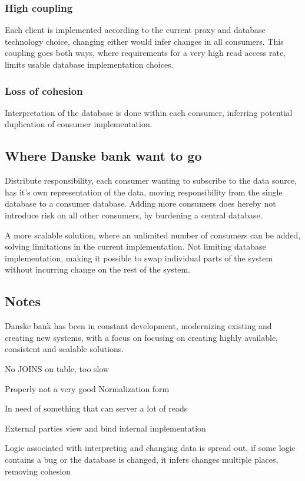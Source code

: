 \subsubsection{High coupling}
Each client is implemented according to the current proxy and database technology choice, changing either would infer changes in all consumers.
This coupling goes both ways, where requirements for a very high read access rate, limits usable database implementation choices.

\subsubsection{Loss of cohesion}
Interpretation of the database is done within each consumer, inferring potential duplication of consumer implementation.


\subsection{Where Danske bank want to go}
Distribute responsibility, each consumer wanting to subscribe to the data source, has it's own representation of the data, moving responsibility from the single database to a consumer database. Adding more consumers does hereby not introduce risk on all other consumers, by burdening a central database.


A more scalable solution, where an unlimited number of consumers can be added, solving limitations in the current implementation. Not limiting database implementation, making it possible to swap individual parts of the system without incurring change on the rest of the system.


\subsection*{Notes}


Danske bank has been in constant development, modernizing existing and creating new systems, with a focus on 
focusing on creating highly available, consistent and scalable solutions.


No JOINS on table, too slow


Properly not a very good Normalization form


In need of something that can server a lot of reads


External parties view and bind internal implementation

Logic associated with interpreting and changing data is spread out, if some logic contains a bug or the database is changed, it infers changes multiple places, removing cohesion